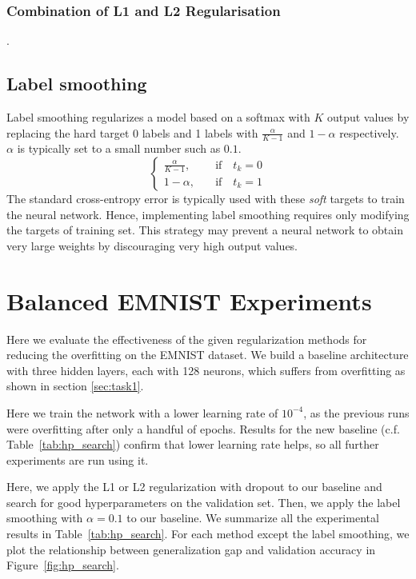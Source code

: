 \documentclass{article}
\begin{document}
\subsubsection{Combination of L1 and L2 Regularisation}
\label{sec:L1L2combo} 

\questionSix.

\subsection{Label smoothing}
Label smoothing regularizes a model based on a softmax with $K$ output values by replacing the hard target 0 labels and 1 labels with $\frac{\alpha}{K-1}$ and $1-\alpha$ respectively. 
$\alpha$ is typically set to a small number such as $0.1$.
\begin{equation}
    \begin{cases}
        \frac{\alpha}{K-1}, & \quad \text{if} \quad t_k=0\\
        1 - \alpha, & \quad \text{if} \quad t_k=1
    \end{cases}    
\end{equation}
The standard cross-entropy error is typically used with these \emph{soft} targets to train the neural network. 
Hence, implementing label smoothing requires only modifying the targets of training set.
This strategy may prevent a neural network to obtain very large weights by discouraging very high output values.

\section{Balanced EMNIST Experiments}

%
%
%
%

\label{sec:task2.2}

Here we evaluate the effectiveness of the given regularization methods for reducing the overfitting on the EMNIST dataset.
We build a baseline architecture with three hidden layers, each with 128 neurons, which suffers from overfitting as shown in section \ref{sec:task1}.

Here we train the network with a lower learning rate of $10^{-4}$, as the previous runs were overfitting after only a handful of epochs. 
Results for the new baseline (c.f. Table~\ref{tab:hp_search}) confirm that lower learning rate helps, so all further experiments are run using it.

Here, we apply the L1 or L2 regularization with dropout to our baseline and search for good hyperparameters on the validation set. 
Then, we apply the label smoothing with $\alpha=0.1$ to our baseline.
We summarize all the experimental results in Table~\ref{tab:hp_search}. For each method except the label smoothing, we plot the relationship between generalization gap and validation accuracy in Figure~\ref{fig:hp_search}.
\end{document}
